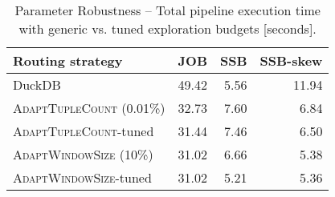 \begin{table}[!t]
	\centering
	 \caption{Parameter Robustness -- Total pipeline execution time with generic vs. tuned exploration budgets [seconds].}
	 \vspace{-0.3cm}  \setlength\tabcolsep{8.7pt}
   \begin{tabular}{lrrr}
	  \toprule
		\textbf{Routing strategy} & \textbf{JOB} & \textbf{SSB} & \textbf{SSB-skew}\\
		\midrule
		DuckDB &      49.42 &       5.56 &      11.94\\
		\midrule
        \textsc{AdaptTupleCount} (0.01\%) &    32.73 &       7.60 &      6.84\\
		\textsc{AdaptTupleCount}-tuned &      31.44 &       7.46 &      6.50\\
        \midrule
		\textsc{AdaptWindowSize} (10\%) &      31.02 &       6.66 &       5.38\\
		\textsc{AdaptWindowSize}-tuned &      31.02 &       5.21 &       5.36\\
  		\bottomrule
	\end{tabular}
	\label{tab:3_3_parameter}
\end{table}
